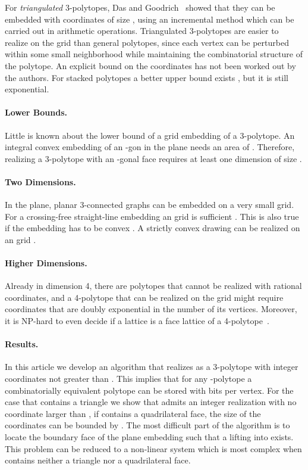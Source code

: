 \documentclass{article}
\theoremstyle{plain} \newtheorem{thm}{Theorem}[section]
\begin{document}
For \emph{triangulated} 3-polytopes,
Das and Goodrich~\cite{dg-copdc-97} showed that they can be embedded with coordinates of size , using an incremental method which can be carried out in  arithmetic operations.
Triangulated 3-polytopes are easier to realize on the grid than general polytopes, since each
vertex can be perturbed within some small neighborhood while
maintaining the combinatorial structure of the polytope. An explicit
bound on the coordinates has not been worked out by the authors.  For
stacked polytopes a better upper bound exists \cite{z-gcsg-07}, but it
is still exponential.

\paragraph{Lower Bounds.}
Little is known about the lower bound of a grid embedding of a 3-polytope. 
An integral convex embedding of an -gon in the plane needs
an area of  \cite{az-mnecd-95,a-lbvsc-61,t-ep-91,vk-mnecd-82}.
Therefore, realizing a 3-polytope with an -gonal face requires
at least one dimension of size .

\paragraph{Two Dimensions.}
In the plane, planar 3-connected graphs  can be embedded on a very small grid.
For a crossing-free straight-line embedding  an  grid
is sufficient \cite{fpp-hdpgg-90,s-epgg-90}.
This is also true if the embedding has to be convex
\cite{bfm-cdpg-06}. A
strictly convex drawing can be realized on an  grid \cite{br-scdpg-06}.
\paragraph{Higher Dimensions.}
Already in dimension 4, there are polytopes that cannot be realized
with rational coordinates, and a 4-polytope that can be realized
on the grid might require coordinates that are doubly exponential in
the number of its vertices. Moreover, it is NP-hard to even decide
if a lattice is a face lattice of a
4-polytope~\cite{rg-rsp-96,gz-rspu-95}.

\paragraph{Results.}
In this article we develop an algorithm that realizes  as a 3-polytope with
integer coordinates not greater than . 
This implies that for any -polytope a combinatorially  equivalent polytope can be stored
with  bits per vertex. 
For the case that  contains a triangle we show that  admits an integer realization with no coordinate larger than , if  contains a quadrilateral  face, the size of the coordinates can be bounded by . The most difficult part of the algorithm is to locate the boundary face of the plane embedding such that a lifting into  exists. This problem can be reduced to a non-linear system which is most complex when  contains neither a triangle nor a quadrilateral face.
\end{document}
